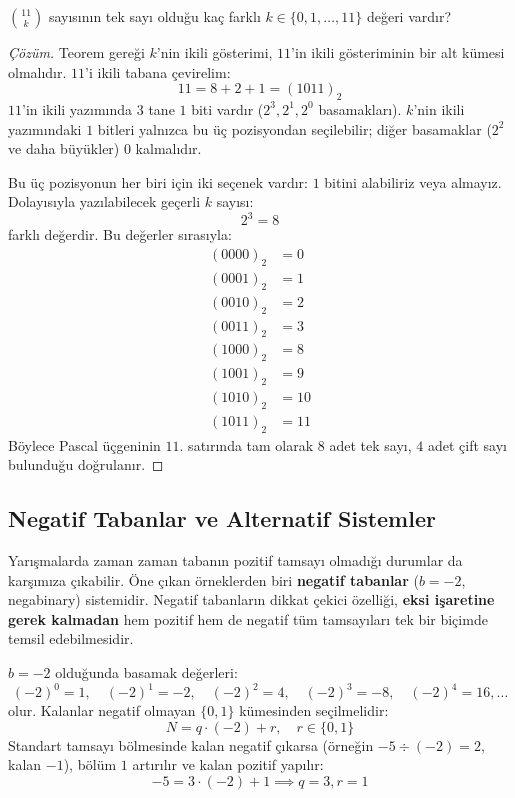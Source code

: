 \begin{example}
$\binom{11}{k}$ sayısının tek sayı olduğu kaç farklı $k \in \{0, 1, \dots, 11\}$ değeri vardır?
\end{example}

\begin{proof}[Çözüm]
Teorem gereği $k$'nin ikili gösterimi, $11$'in ikili gösteriminin bir alt kümesi olmalıdır.
$11$'i ikili tabana çevirelim:
\[
11 = 8 + 2 + 1 = (1011)_2
\]
$11$'in ikili yazımında $3$ tane $1$ biti vardır ($2^3, 2^1, 2^0$ basamakları).
$k$'nin ikili yazımındaki $1$ bitleri yalnızca bu üç pozisyondan seçilebilir; diğer basamaklar ($2^2$ ve daha büyükler) $0$ kalmalıdır.

Bu üç pozisyonun her biri için iki seçenek vardır: $1$ bitini alabiliriz veya almayız.
Dolayısıyla yazılabilecek geçerli $k$ sayısı:
\[
2^3 = 8
\]
farklı değerdir. Bu değerler sırasıyla:
\begin{align*}
(0000)_2 &= 0 \\
(0001)_2 &= 1 \\
(0010)_2 &= 2 \\
(0011)_2 &= 3 \\
(1000)_2 &= 8 \\
(1001)_2 &= 9 \\
(1010)_2 &= 10 \\
(1011)_2 &= 11
\end{align*}
Böylece Pascal üçgeninin $11$. satırında tam olarak $8$ adet tek sayı, $4$ adet çift sayı bulunduğu doğrulanır.
\end{proof}

\subsection{Negatif Tabanlar ve Alternatif Sistemler}

Yarışmalarda zaman zaman tabanın pozitif tamsayı olmadığı durumlar da karşımıza çıkabilir. Öne çıkan örneklerden biri \textbf{negatif tabanlar} ($b = -2$, negabinary) sistemidir. Negatif tabanların dikkat çekici özelliği, \textbf{eksi işaretine gerek kalmadan} hem pozitif hem de negatif tüm tamsayıları tek bir biçimde temsil edebilmesidir.

$b = -2$ olduğunda basamak değerleri:
\[
(-2)^0 = 1, \quad (-2)^1 = -2, \quad (-2)^2 = 4, \quad (-2)^3 = -8, \quad (-2)^4 = 16, \dots
\]
olur. Kalanlar negatif olmayan $\{0, 1\}$ kümesinden seçilmelidir:
\[
N = q \cdot (-2) + r, \quad r \in \{0, 1\}
\]
Standart tamsayı bölmesinde kalan negatif çıkarsa (örneğin $-5 \div (-2) = 2$, kalan $-1$), bölüm $1$ artırılır ve kalan pozitif yapılır:
\[
-5 = 3 \cdot (-2) + 1 \implies q = 3, r = 1
\]

